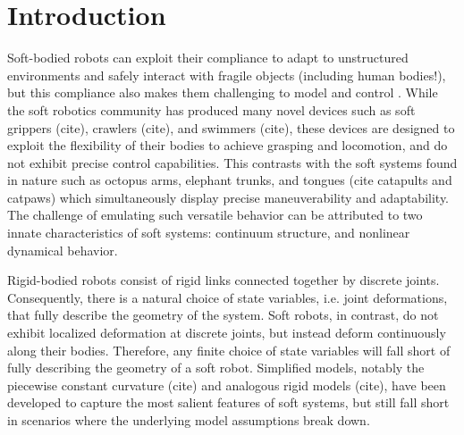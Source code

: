 \section{Introduction} 
\label{sec:intro}

Soft-bodied robots can exploit their compliance to adapt to unstructured environments and safely interact with fragile objects (including human bodies!), but this compliance also makes them challenging to model and control \cite{rus2015design}.
While the soft robotics community has produced many novel devices such as soft grippers (cite), crawlers (cite), and swimmers (cite), these devices are designed to exploit the flexibility of their bodies to achieve grasping and locomotion, and do not exhibit precise control capabilities.
This contrasts with the soft systems found in nature such as octopus arms, elephant trunks, and tongues (cite catapults and catpaws) which simultaneously display precise maneuverability and adaptability.
The challenge of emulating such versatile behavior can be attributed to two innate characteristics of soft systems: continuum structure, and nonlinear dynamical behavior. 

Rigid-bodied robots consist of rigid links connected together by discrete joints.
Consequently, there is a natural choice of state variables, i.e. joint deformations, that fully describe the geometry of the system.
Soft robots, in contrast, do not exhibit localized deformation at discrete joints, but instead deform continuously along their bodies.
Therefore, any finite choice of state variables will fall short of fully describing the geometry of a soft robot.
Simplified models, notably the piecewise constant curvature (cite) and analogous rigid models (cite), have been developed to capture the most salient features of soft systems, but still fall short in scenarios where the underlying model assumptions break down. 

